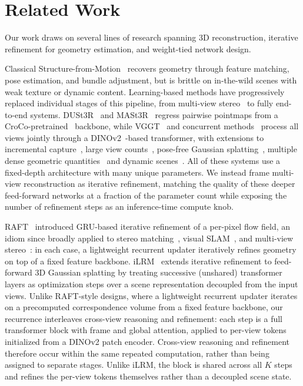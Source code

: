 \section{Related Work}
\label{sec:related_work}

Our work draws on several lines of research spanning 3D reconstruction, iterative refinement for geometry estimation, and weight-tied network design.

Classical Structure-from-Motion~\citep{schoenberger2016sfm,pan2024global} recovers geometry through feature matching, pose estimation, and bundle adjustment, but is brittle on in-the-wild scenes with weak texture or dynamic content. Learning-based methods have progressively replaced individual stages of this pipeline, from multi-view stereo~\citep{yao2018mvsnet} to fully end-to-end systems. DUSt3R~\citep{dust3r} and MASt3R~\citep{leroy2025grounding} regress pairwise pointmaps from a CroCo-pretrained~\citep{weinzaepfel2022croco} backbone, while VGGT~\citep{vggt} and concurrent methods~\citep{wang2025pi,lin2025depth,keetha2026mapanything,vggt_omega} process all views jointly through a DINOv2~\citep{oquab2023dinov2}-based transformer, with extensions to incremental capture~\citep{wang2025spann3r,cut3r}, large view counts~\citep{yang2025fast3R, vggttt}, pose-free Gaussian splatting~\citep{ye2025noposplat}, multiple dense geometric quantities~\citep{dens3r} and dynamic scenes~\citep{zhang2025monst3r, vdpm, luo20264rc}. All of these systems use a fixed-depth architecture with many unique parameters. We instead frame multi-view reconstruction as iterative refinement, matching the quality of these deeper feed-forward networks at a fraction of the parameter count while exposing the number of refinement steps as an inference-time compute knob.

RAFT~\citep{RAFT} introduced GRU-based iterative refinement of a per-pixel flow field, an idiom since broadly applied to stereo matching~\citep{lipson2021raft}, visual SLAM~\citep{DroidSLAM,huang2025vipe}, and multi-view stereo~\citep{wang2022itermvs}: in each case, a lightweight recurrent updater iteratively refines geometry on top of a fixed feature backbone. iLRM~\citep{kang2026ilrm} extends iterative refinement to feed-forward 3D Gaussian splatting by treating successive (unshared) transformer layers as optimization steps over a scene representation decoupled from the input views. 
Unlike RAFT-style designs, where a lightweight recurrent updater iterates on a precomputed correspondence volume from a fixed feature backbone, our recurrence interleaves cross-view reasoning and refinement: each step is a full transformer block with frame and global attention, applied to per-view tokens initialized from a DINOv2 patch encoder. Cross-view reasoning and refinement therefore occur within the same repeated computation, rather than being assigned to separate stages.
Unlike iLRM, the block is shared across all $K$ steps and refines the per-view tokens themselves rather than a decoupled scene state.

